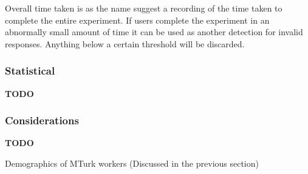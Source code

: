 Overall time taken is as the name suggest a recording of the time taken to complete the entire experiment. If users complete the experiment in an abnormally small amount of time it can be used as another detection for invalid responses. Anything below a certain threshold will be discarded.

\subsubsection{Statistical}
\textbf{TODO}

\subsubsection{Considerations}
\textbf{TODO}

Demographics of MTurk workers (Discussed in the previous section)